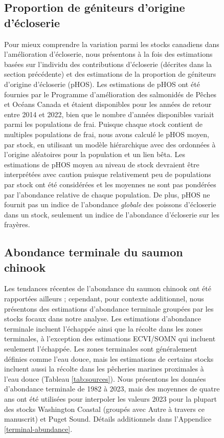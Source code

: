 \begin{figure}[H]
\subsection{Proportion de géniteurs d'origine d'écloserie}

Pour mieux comprendre la variation parmi les stocks canadiens dans l'amélioration d'écloserie, nous présentons à la fois des estimations basées sur l'individu des contributions d'écloserie (décrites dans la section précédente) et des estimations de la proportion de géniteurs d'origine d'écloserie (pHOS). Les estimations de pHOS ont été fournies par le Programme d'amélioration des salmonidés de Pêches et Océans Canada et étaient disponibles pour les années de retour entre 2014 et 2022, bien que le nombre d'années disponibles variait parmi les populations de frai. Puisque chaque stock contient de multiples populations de frai, nous avons calculé le pHOS moyen, par stock, en utilisant un modèle hiérarchique avec des ordonnées à l'origine aléatoires pour la population et un lien bêta. Les estimations de pHOS moyen au niveau de stock devraient être interprétées avec caution puisque relativement peu de populations par stock ont été considérées et les moyennes ne sont pas pondérées par l'abondance relative de chaque population. De plus, pHOS ne fournit pas un indice de l'abondance \textit{globale} des poissons d'écloserie dans un stock, seulement un indice de l'abondance d'écloserie sur les frayères.

\subsection{Abondance terminale du saumon chinook}

Les tendances récentes de l'abondance du saumon chinook ont été rapportées ailleurs \cite[p. ex.,][]{atlasTrendsChinookSalmon2023, ctcAnnualReportCatch2024a} ; cependant, pour contexte additionnel, nous présentons des estimations d'abondance terminale groupées par les stocks focaux dans notre analyse. Les estimations d'abondance terminale incluent l'échappée ainsi que la récolte dans les zones terminales, à l'exception des estimations ECVI/SOMN qui incluent seulement l'échappée. Les zones terminales sont généralement définies comme l'eau douce, mais les estimations de certains stocks incluent aussi la récolte dans les pêcheries marines proximales à l'eau douce (Tableau \ref{tab:sources}). Nous présentons les données d'abondance terminale de 1982 à 2023, mais des moyennes de quatre ans ont été utilisées pour interpoler les valeurs 2023 pour la plupart des stocks Washington Coastal (groupés avec Autre à travers ce manuscrit) et Puget Sound. Détails additionnels dans l'Appendice \ref{terminal-abundance}.


\end{figure}
